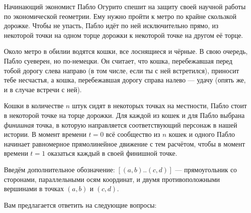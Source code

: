\vspace{-0.35cm} 

\ms Начинающий экономист Пабло Огурито спешит на защиту своей научной работы по экономической геометрии. Ему нужно пройти к метро по крайне скользкой дорожке. Чтобы не упасть, Пабло идёт по ней исключительно прямо, из некоторой точки на одном торце дорожки к некоторой точке на другом её торце.

\ms Около метро в обилии водятся кошки, все лоснящиеся и чёрные. В свою очередь, Пабло суеверен, но по-немецки. Он считает, что кошка, перебежавшая перед тобой дорогу слева направо (в том числе, если ты с ней встретился), приносит тебе несчастья, а кошка, перебежавшая дорогу справа налево — удачу (опять же, и в случае встречи с ней).

\ms Кошки в количестве $n$ штук сидят в некоторых точках на местности, Пабло стоит в некоторой точке на торце дорожки. Для каждой из кошек и для Пабло выбрана {\itshape финишная} точка, в которую направляется соответствующий персонаж в нашей истории. В момент времени $t=0$ всё сообщество из $n$ кошек и одного Пабло начинает равномерное прямолинейное движение с тем расчётом, чтобы в момент времени $t=1$ оказаться каждый в своей финишной точке.

\ms Введём дополнительное обозначение: $[(a,b)..(c,d)]$ --- прямоугольник со сторонами, параллельными осям координат, и двумя противоположными вершинами в точках $(a,b)$ и $(c,d)$.

\ms Вам предлагается ответить на следующие вопросы:

